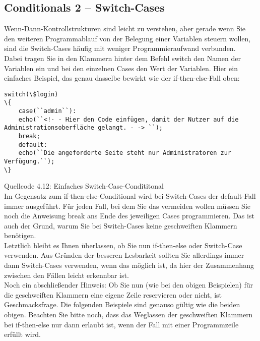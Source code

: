 \subsection{Conditionals 2 – Switch-Cases}

Wenn-Dann-Kontrollstrukturen sind leicht zu verstehen, aber gerade wenn Sie den weiteren Programmablauf von der Belegung einer Variablen steuern wollen, sind die Switch-Cases häufig mit weniger Programmieraufwand verbunden.\\

Dabei tragen Sie in den Klammern hinter dem \glqq{}Befehl\grqq{} switch den Namen der Variablen ein und bei den einzelnen Cases den Wert der Variablen. Hier ein einfaches Beispiel, das genau dasselbe bewirkt wie der if-then-else-Fall oben:\\

\begin{verbatim}
switch(\$login)
\{
	case(``admin``):
	echo(``<!- - Hier den Code einfügen, damit der Nutzer auf die Administrationsoberfläche gelangt. - -> ``);
	break;
	default:
	echo(``Die angeforderte Seite steht nur Administratoren zur Verfügung.``);
\}
\end{verbatim}
Quellcode 4.12: Einfaches Switch-Case-Condititonal\\

Im Gegensatz zum if-then-else-Conditional wird bei Switch-Cases der default-Fall immer ausgeführt. Für jeden Fall, bei dem Sie das vermeiden wollen müssen Sie noch die Anweisung break ans Ende des jeweiligen Cases programmieren. Das ist auch der Grund, warum Sie bei Switch-Cases keine geschweiften Klammern benötigen.\\

Letztlich bleibt es Ihnen überlassen, ob Sie nun if-then-else oder Switch-Case verwenden. Aus Gründen der besseren Lesbarkeit sollten Sie allerdings immer dann Switch-Cases verwenden, wenn das möglich ist, da hier der Zusammenhang zwischen den Fällen leicht erkennbar ist.\\

Noch ein abschließender Hinweis: Ob Sie nun (wie bei den obigen Beispielen) für die geschweiften Klammern eine eigene Zeile reservieren oder nicht, ist Geschmacksfrage. Die folgenden Beispiele sind genauso gültig wie die beiden obigen. Beachten Sie bitte noch, dass das Weglassen der geschweiften Klammern bei if-then-else nur dann erlaubt ist, wenn der Fall mit einer Programmzeile erfüllt wird.\\

